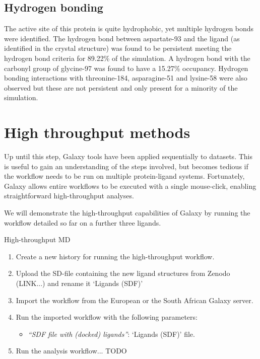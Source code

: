 \documentclass[twocolumn]{bmcart}%
\providecommand{\tightlist}{%
  \setlength{\itemsep}{0pt}\setlength{\parskip}{0pt}}
\begin{document}
\subsection*{Hydrogen bonding}
The active site of this protein is quite hydrophobic, yet multiple hydrogen bonds were identified. The hydrogen bond between aspartate-93 and the ligand (as identified in the crystal structure) was found to be persistent meeting the hydrogen bond criteria for 89.22\% of the simulation. A hydrogen bond with the carbonyl group of glycine-97 was found to have a 15.27\% occupancy. Hydrogen bonding interactions with threonine-184, asparagine-51 and lysine-58 were also observed but these are not persistent and only present for a minority of the simulation.

\hypertarget{optional-automating-high-throughput-calculations}{%
\section*{High throughput methods}\label{optional-automating-high-throughput-calculations}}

Up until this step, Galaxy tools have been applied sequentially to datasets. This is useful to gain an understanding of the steps involved, but becomes tedious if the workflow needs to be run on multiple protein-ligand systems. Fortunately, Galaxy allows entire workflows to be executed with a single mouse-click, enabling straightforward high-throughput analyses.

We will demonstrate the high-throughput capabilities of Galaxy by running the workflow detailed so far on a further three ligands.

\begin{handson_box_colour}{High-throughput MD}

\begin{enumerate}
\def\labelenumi{\arabic{enumi}.}
\tightlist
\item
  Create a new history for running the high-throughput workflow.

\item
  Upload the SD-file containing the new ligand structures from Zenodo (LINK...) and rename it `Ligands (SDF)'
\item
  Import the workflow from the European\cite{eu_htmd_simulation_workflow} or the South African Galaxy server.
\item
  Run the imported workflow with the following parameters:

  \begin{itemize}
  \tightlist
  \item
    \emph{``SDF file with (docked) ligands''}: `Ligands (SDF)' file.
  \end{itemize}
\item
  Run the analysis workflow... TODO
\end{enumerate}
\end{handson_box_colour}
\end{document}
